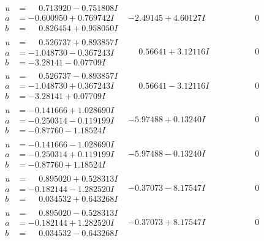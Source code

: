 \documentclass[1p]{elsarticle_modified}
\theoremstyle{definition}
\begin{document}
$$\begin{array}{c|c|c}
\begin{aligned}
u &= \phantom{-}0.713920 - 0.751808 I \\
a &= -0.600950 + 0.769742 I \\
b &= \phantom{-}0.826454 + 0.958050 I\end{aligned}
 & -2.49145 + 4.60127 I & \phantom{-0.000000 } 0 \\ \hline\begin{aligned}
u &= \phantom{-}0.526737 + 0.893857 I \\
a &= -1.048730 - 0.367243 I \\
b &= -3.28141 - 0.07709 I\end{aligned}
 & \phantom{-}0.56641 + 3.12116 I & \phantom{-0.000000 } 0 \\ \hline\begin{aligned}
u &= \phantom{-}0.526737 - 0.893857 I \\
a &= -1.048730 + 0.367243 I \\
b &= -3.28141 + 0.07709 I\end{aligned}
 & \phantom{-}0.56641 - 3.12116 I & \phantom{-0.000000 } 0 \\ \hline\begin{aligned}
u &= -0.141666 + 1.028690 I \\
a &= -0.250314 - 0.119199 I \\
b &= -0.87760 - 1.18524 I\end{aligned}
 & -5.97488 + 0.13240 I & \phantom{-0.000000 } 0 \\ \hline\begin{aligned}
u &= -0.141666 - 1.028690 I \\
a &= -0.250314 + 0.119199 I \\
b &= -0.87760 + 1.18524 I\end{aligned}
 & -5.97488 - 0.13240 I & \phantom{-0.000000 } 0 \\ \hline\begin{aligned}
u &= \phantom{-}0.895020 + 0.528313 I \\
a &= -0.182144 - 1.282520 I \\
b &= \phantom{-}0.034532 + 0.643268 I\end{aligned}
 & -0.37073 - 8.17547 I & \phantom{-0.000000 } 0 \\ \hline\begin{aligned}
u &= \phantom{-}0.895020 - 0.528313 I \\
a &= -0.182144 + 1.282520 I \\
b &= \phantom{-}0.034532 - 0.643268 I\end{aligned}
 & -0.37073 + 8.17547 I & \phantom{-0.000000 } 0 \\ \hline\begin{aligned}

\end{aligned}
\end{array}$$
\end{document}
